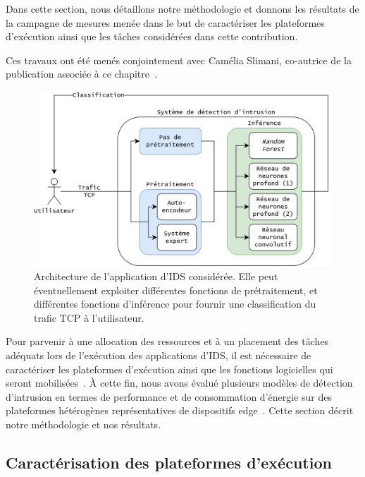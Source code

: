 Dans cette section, nous détaillons notre méthodologie et donnons les résultats de la campagne de mesures menée dans le but de caractériser les plateformes d'exécution ainsi que les tâches considérées dans cette contribution.

Ces travaux ont été menés conjointement avec Camélia Slimani, co-autrice de la publication associée à ce chapitre~\cite{herocache}.

\begin{figure}[!ht]
    \centering
    \includegraphics[width=0.8\columnwidth]{5_Chapitre5/figures/ids-application.png}
    \caption{Architecture de l'application d'IDS considérée. Elle peut éventuellement exploiter différentes fonctions de prétraitement, et différentes fonctions d'inférence pour fournir une classification du trafic \gls{TCP} à l'utilisateur.}
    \label{figure:herocache-ids-application}
\end{figure}

Pour parvenir à une allocation des ressources et à un placement des tâches adéquats lors de l'exécution des applications d'\gls{IDS}, il est nécessaire de caractériser les plateformes d'exécution ainsi que les fonctions logicielles qui seront mobilisées~\cite{mampageHolisticViewResource2022}. À cette fin, nous avons évalué plusieurs modèles de détection d'intrusion en termes de performance et de consommation d'énergie sur des plateformes hétérogènes représentatives de dispositifs edge~\cite{kljucaric2020}. Cette section décrit notre méthodologie et nos résultats.

\subsection{Caractérisation des plateformes d'exécution} \label{section:herocache-characterization-platforms}

